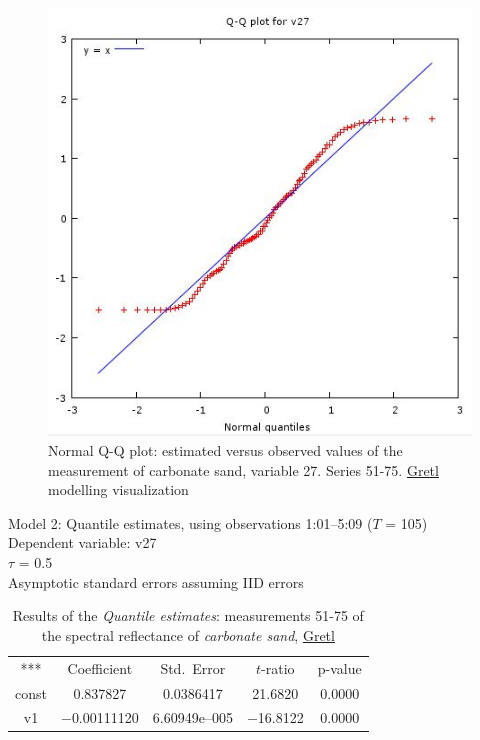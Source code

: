 \documentclass[10pt, a4paper]{article}
\begin{document}
\begin{appendices}
\begin{figure}[H]
	\begin{center}
		\includegraphics[scale=0.4]{G-QQplot-sand.jpg}
		\caption{Normal Q-Q plot: estimated versus observed values of the measurement of carbonate sand, variable 27. Series 51-75. \href{http://gretl.sourceforge.net/}{Gretl} modelling visualization­}
	\label{fig:A.30}
	\end{center}
\end{figure}

\begin{table}[H]
	\caption{Results of the \textit{Quantile estimates}: measurements 51-75 of the spectral reflectance of \textit{carbonate sand}, \href{http://gretl.sourceforge.net/}{Gretl}}
	\begin{center}
		Model 2: Quantile estimates, using observations 1:01--5:09 ($T$ = 105)\\
		Dependent variable: v27\\
		$\tau$ = 0.5\\
		Asymptotic standard errors assuming IID errors\\

\vspace{1em}

\begin{tabular}{c c c c c}
	***   & {Coefficient} & {Std.\ Error} & {$t$-ratio} & {p-value} \\[1ex]
	const &  0.837827 &    0.0386417 &      21.6820 &         0.0000 \\
	v1 &   $-$0.00111120 &     6.60949\textrm{e--005} &       $-$16.8122 &         0.0000 \\ \hline \hline
\end{tabular}


\end{center}
\end{table}
\end{appendices}
\end{document}
